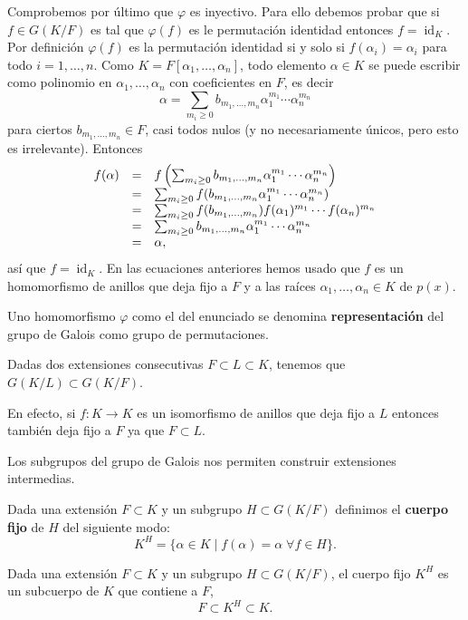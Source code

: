 Comprobemos por último que \(\varphi\) es inyectivo. Para ello debemos
probar que si \(f\in G(K/F)\) es tal que \(\varphi(f)\) es le
permutación identidad entonces \(f=\operatorname{id}_{K}\). Por
definición \(\varphi(f)\) es la permutación identidad si y solo si
\(f(\alpha_i)=\alpha_i\) para todo \(i=1,\dots,n\). Como
\(K=F[\alpha_1,\dots,\alpha_n]\), todo elemento \(\alpha\in K\) se
puede escribir como polinomio en \(\alpha_1,\dots,\alpha_n\) con
coeficientes en \(F\), es decir
\[\alpha=\sum_{m_i\geq 0} b_{m_1,\dots,m_n}\alpha_1^{m_1}\cdots\alpha_n^{m_n}\]
para ciertos \(b_{m_1,\dots,m_n}\in F\), casi todos nulos (y no
necesariamente únicos, pero esto es irrelevante). Entonces
\[\begin{array}{rcl}
f(\alpha)&=&f\left(\sum_{m_i\geq 0} b_{m_1,\dots,m_n}\alpha_1^{m_1}\cdots\alpha_n^{m_n}\right)\cr
&=&\sum_{m_i\geq 0} f(b_{m_1,\dots,m_n}\alpha_1^{m_1}\cdots\alpha_n^{m_n})\cr
&=&\sum_{m_i\geq 0} f(b_{m_1,\dots,m_n})f(\alpha_1)^{m_1}\cdots f(\alpha_n)^{m_n}\cr
&=&\sum_{m_i\geq 0} b_{m_1,\dots,m_n}\alpha_1^{m_1}\cdots\alpha_n^{m_n}\cr
&=&\alpha,
\end{array}\] así que \(f=\operatorname{id}_{K}\). En las ecuaciones
anteriores hemos usado que \(f\) es un homomorfismo de anillos que deja
fijo a \(F\) y a las raíces \(\alpha_1,\dots,\alpha_n\in K\) de
\(p(x)\). 

Uno homomorfismo \(\varphi\) como el del enunciado se denomina
\textbf{representación} del grupo de Galois como grupo de permutaciones.


Dadas dos extensiones consecutivas \(F\subset L\subset K\), tenemos que
\(G(K/L)\subset G(K/F)\). 


En efecto, si \(f\colon K\rightarrow K\) es un isomorfismo de anillos
que deja fijo a \(L\) entonces también deja fijo a \(F\) ya que
\(F\subset L\). 

Los subgrupos del grupo de Galois nos permiten construir extensiones
intermedias.


Dada una extensión \(F\subset K\) y un subgrupo \(H\subset G(K/F)\)
definimos el \textbf{cuerpo fijo} de \(H\) del siguiente modo:
\[K^{H}=\{\alpha\in K\;|\; f(\alpha)=\alpha\;\forall f\in H\}.\]


Dada una extensión \(F\subset K\) y un subgrupo \(H\subset G(K/F)\), el
cuerpo fijo \(K^H\) es un subcuerpo de \(K\) que contiene a \(F\),
\[F\subset K^H\subset K.\] 

